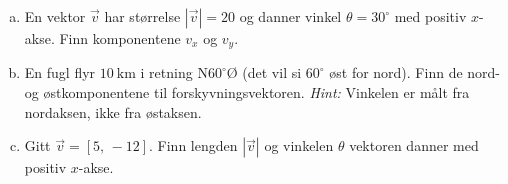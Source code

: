 %
\begin{enumerate}[a)]
    \item En vektor $\vec{v}$ har størrelse $|\vec{v}| = 20$ og danner vinkel $\theta = 30^\circ$ med positiv $x$-akse. Finn komponentene $v_x$ og $v_y$.
    \item En fugl flyr $\SI{10}{\kilo\metre}$ i retning N$60^\circ$Ø (det vil si $60^\circ$ øst for nord). Finn de nord- og østkomponentene til forskyvningsvektoren. \textit{Hint:} Vinkelen er målt fra nordaksen, ikke fra østaksen.
    \item Gitt $\vec{v} = [5,\,-12]$. Finn lengden $|\vec{v}|$ og vinkelen $\theta$ vektoren danner med positiv $x$-akse.
\end{enumerate}
